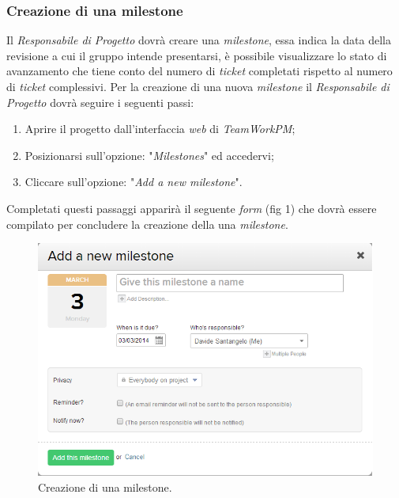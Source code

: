 \subsubsection{Creazione di una milestone}
Il \textit{Responsabile di Progetto} dovrà creare una \textit{milestone}, essa indica la data della revisione a cui il gruppo \gruppo{} intende presentarsi, è possibile visualizzare lo stato di avanzamento che tiene conto del numero di \textit{ticket} completati rispetto al numero di \textit{ticket} complessivi.
Per la creazione di una nuova \textit{milestone} il \textit{Responsabile di Progetto} dovrà seguire i seguenti passi:
\begin{enumerate}
\item Aprire il progetto dall'interfaccia \textit{web} di \textit{TeamWorkPM};
\item Posizionarsi sull'opzione: "\emph{Milestones}" ed accedervi;
\item Cliccare sull'opzione: "\emph{Add a new milestone}".
\end{enumerate}

Completati questi passaggi apparirà il seguente \textit{form} (fig 1) che dovrà essere compilato per concludere la creazione della una \textit{milestone}.
\begin{figure}
\centering
\includegraphics[width=%
\textwidth]{immaginiNDP/Immagine}
\caption[]{Creazione di una milestone.}
\label{fig:Immagine}
\end{figure}

